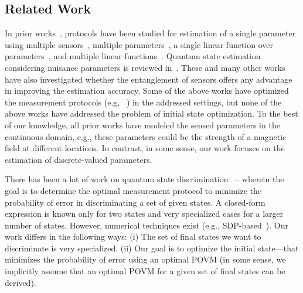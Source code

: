 \subsection{Related Work}
\label{sec:related}

In prior works~\cite{Eldredge_2018,Rubio_2020}, protocols have been studied for estimation of a single parameter using multiple sensors~\cite{Giovannetti_2011}, multiple parameters~\cite{mpe_2018,mpe_2020}, a single linear function over parameters~\cite{Eldredge_2018,mpe_2018,Sidhu_2020}, and multiple linear functions~\cite{Rubio_2020,Altenburg_2019}. 
Quantum state estimation considering nuisance parameters is reviewed in~\cite{Suzuki_2020}.
These and many other works~\cite{Eldredge_2018,mpe_2018,Jacobs_2018} have also
investigated whether the entanglement of sensors offers any advantage 
in improving the estimation accuracy. Some of the above works have optimized
the measurement protocols (e.g, ~\cite{Eldredge_2018,PhysRevA.qsn}) in the addressed
settings, but none of the above works have addressed the problem of initial state optimization.
To the best of our knowledge, all prior works have modeled the 
sensed parameters in the continuous domain, e.g., these parameters could be the 
strength of a magnetic field at different locations. In contrast, in some sense, our work focuses on the estimation of discrete-valued parameters. 


There has been a lot of work on quantum state discrimination~\cite{bergou-review-2007,bergou2004,Bae_2015,Barnett-review} -- wherein the goal is to determine the 
optimal measurement protocol to minimize the probability of error
in discriminating a set of given states. 
A closed-form expression is known only for two states and very specialized cases for a larger
number of states. However, numerical techniques exist (e.g., SDP-based~\cite {semidefinite}).
Our work differs in the following ways: (i) The set of final states we want to discriminate is very 
specialized. (ii) Our goal is to optimize the initial state---that minimizes the probability of error using an optimal POVM (in some sense, we implicitly assume that an optimal POVM for a given set of final states can be derived). 


